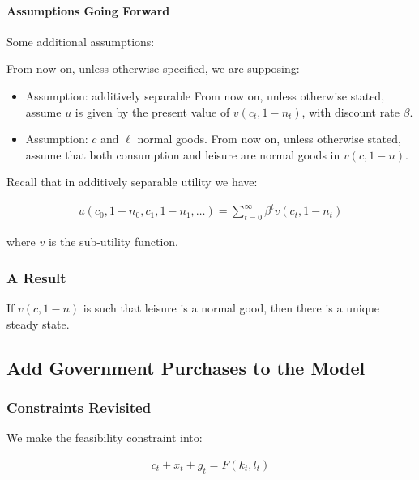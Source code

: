 \documentclass[10pt]{article}
\begin{document}
\paragraph{Assumptions Going Forward}

Some additional assumptions:

From now on, unless otherwise specified, we are supposing:

\begin{itemize}
    \item Assumption: additively separable From now on, unless otherwise stated, assume $u$ is given by the present value of $v\left(c_t, 1-n_t\right)$, with discount rate $\beta$.
    \item Assumption: $c$ and $\ell$ normal goods. From now on, unless otherwise stated, assume that both consumption and leisure are normal goods in $v(c, 1-n)$.
\end{itemize}

Recall that in additively separable utility we have:

\begin{align}
    u\left(c_0, 1-n_0, c_1, 1-n_1, \ldots\right)=\sum_{t=0}^{\infty} \beta^t v\left(c_t, 1-n_t\right)
\end{align}

where $v$ is the sub-utility function.

\subsubsection{A Result}

\begin{proposition} 
    If $v(c, 1-n)$ is such that leisure is a normal good, then there is a unique steady state.
\end{proposition}

\subsection{Add Government Purchases to the Model}

\subsubsection{Constraints Revisited}

We make the feasibility constraint into:

\begin{align}
    c_t+x_t+g_t=F\left(k_t, l_t\right)
\end{align}
\end{document}
